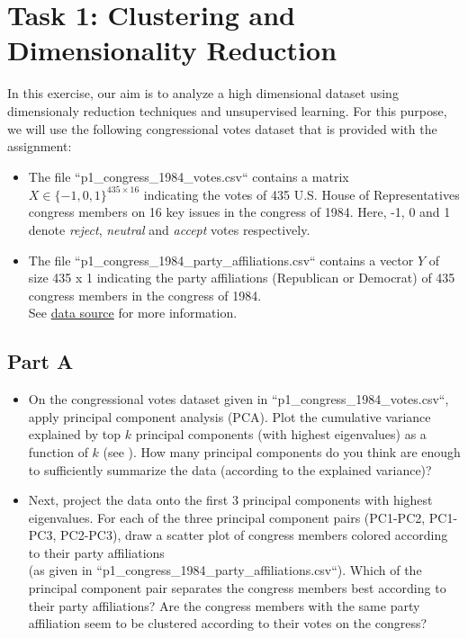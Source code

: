 \documentclass[11pt]{article}
\newcommand{\filenameE}{``p1\_congress\_1984\_votes.csv``}
\newcommand{\filenameF}{``p1\_congress\_1984\_party\_affiliations.csv``}
\begin{document}

\section*{Task 1: Clustering and Dimensionality Reduction}
In this exercise, our aim is to analyze a high dimensional dataset using dimensionaly reduction techniques and unsupervised learning. For this purpose, we will use the following congressional votes dataset that is provided with the assignment: 

\begin{itemize}
	\itemsep -0.2em 
	\item The file \filenameE{} contains a matrix $X \in \{-1, 0, 1\}^{435 \times 16}$ indicating the votes of 435 U.S. House of Representatives congress members on 16 key issues in the congress of 1984. Here, -1, 0 and 1 denote \textit{reject}, \textit{neutral} and \textit{accept} votes respectively.
	\item The file \filenameF{} contains a vector $Y$ of size 435 x 1  indicating the party affiliations (Republican or Democrat) of 435 congress members in the congress of 1984. \\See \href{https://archive.ics.uci.edu/ml/datasets/congressional+voting+records}{data source} for more information.
\end{itemize}

\subsection*{Part A}
	
 \begin{itemize}
 \item
 On the congressional votes dataset given in \filenameE{}, apply principal component analysis (PCA). Plot the cumulative variance explained by top $k$ principal components (with highest eigenvalues) as a function of $k$ (see ). How many principal components do you think are enough to sufficiently summarize the data (according to the explained variance)? 
 
 \item
 Next, project the data onto the first 3 principal components with highest eigenvalues. For each of the three principal component pairs (PC1-PC2, PC1-PC3, PC2-PC3), draw a scatter plot of congress members colored according to their party affiliations\\ (as given in \filenameF{}). Which of the principal component pair separates the congress members best according to their party affiliations? Are the congress members with the same party affiliation seem to be clustered according to their votes on the congress?
\end{itemize}
 
\end{document}
